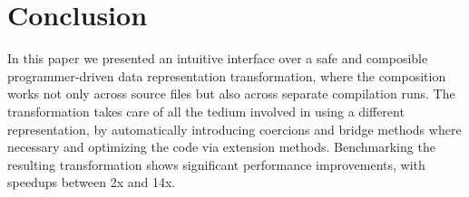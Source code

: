 \section{Conclusion}
\label{sec:concls}

In this paper we presented an intuitive interface over a safe and
composible programmer-driven data representation transformation, where
the composition works not only across source files but also across
separate compilation runs.
The transformation takes care of all the tedium involved in using a
different representation, by automatically introducing coercions and
bridge methods where necessary and optimizing the code via extension
methods. Benchmarking the resulting transformation shows significant
performance improvements, with speedups between 2x and 14x.
